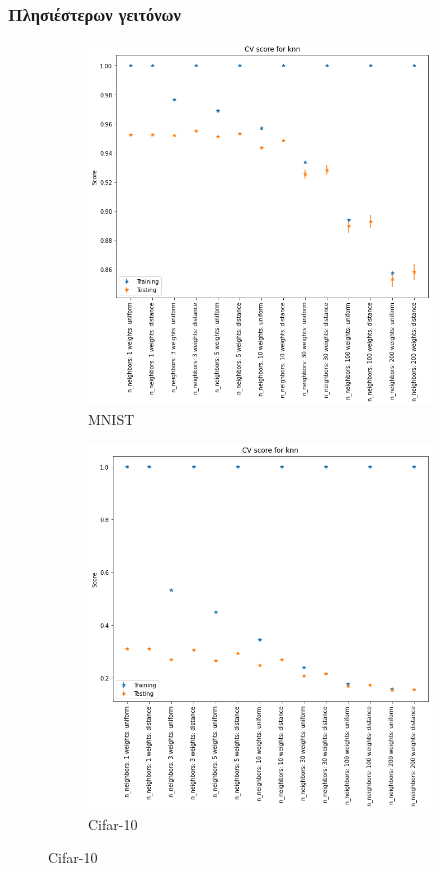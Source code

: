 \documentclass{beamer}
\begin{document}
\begin{frame}
\frametitle{Πλησιέστερων γειτόνων}

\begin{figure}[H]
    \centering

    \begin{subfigure}[t]{0.45\linewidth}
    \includegraphics[width=\linewidth]{figures/mnist/cv_results_knn.png}
    \caption{MNIST}
    \end{subfigure}
    \begin{subfigure}[t]{0.45\linewidth}
    \includegraphics[width=\linewidth]{figures/cifar/cv_results_knn.png}
    \caption{Cifar-10}
    \end{subfigure}


\end{figure}
\end{frame}
\end{document}
